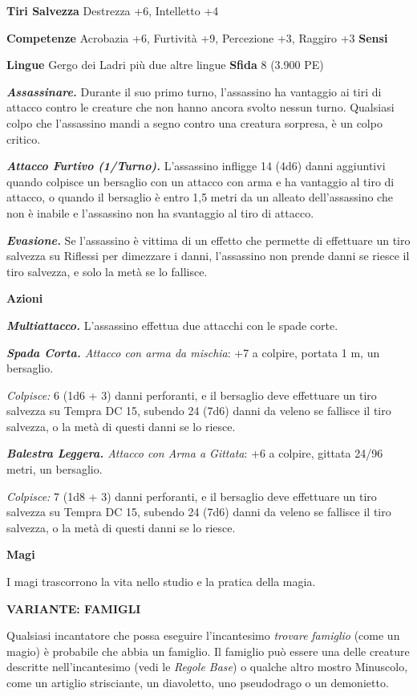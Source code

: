 \begin{multicols}{2}
\textbf{Tiri Salvezza} Destrezza +6, Intelletto +4

\textbf{Competenze} Acrobazia +6, Furtività +9, Percezione +3, Raggiro +3
\textbf{Sensi} 

\textbf{Lingue} Gergo dei Ladri più due altre lingue \textbf{Sfida} 8
(3.900 PE)\smallskip

\emph{\textbf{Assassinare.}} Durante il suo primo turno, l'assassino ha
vantaggio ai tiri di attacco contro le creature che non hanno ancora
svolto nessun turno. Qualsiasi colpo che l'assassino mandi a segno
contro una creatura sorpresa, è un colpo critico.

\emph{\textbf{Attacco Furtivo (1/Turno).}} L'assassino infligge 14 (4d6)
danni aggiuntivi quando colpisce un bersaglio con un attacco con arma e
ha vantaggio al tiro di attacco, o quando il bersaglio è entro 1,5 metri
da un alleato dell'assassino che non è inabile e l'assassino non ha
svantaggio al tiro di attacco.

\emph{\textbf{Evasione.}} Se l'assassino è vittima di un effetto che
permette di effettuare un tiro salvezza su Riflessi per dimezzare i
danni, l'assassino non prende danni se riesce il tiro salvezza, e solo
la metà se lo fallisce.

\smallskip\textbf{Azioni}

\emph{\textbf{Multiattacco.}} L'assassino effettua due attacchi con le
spade corte.

\emph{\textbf{Spada Corta.} Attacco con arma da mischia}: +7 a colpire,
portata 1 m, un bersaglio.

\emph{Colpisce:} 6 (1d6 + 3) danni perforanti, e il bersaglio deve
effettuare un tiro salvezza su Tempra DC 15, subendo 24 (7d6)
danni da veleno se fallisce il tiro salvezza, o la metà di questi danni
se lo riesce.

\emph{\textbf{Balestra Leggera.} Attacco con Arma a Gittata}: +6 a
colpire, gittata 24/96 metri, un bersaglio.

\emph{Colpisce:} 7 (1d8 + 3) danni perforanti, e il bersaglio deve
effettuare un tiro salvezza su Tempra DC 15, subendo 24 (7d6)
danni da veleno se fallisce il tiro salvezza, o la metà di questi danni
se lo riesce.

\textbf{Magi}

I magi trascorrono la vita nello studio e la pratica della magia.

\textbf{VARIANTE: FAMIGLI}

Qualsiasi incantatore che possa eseguire l'incantesimo \emph{trovare}
\emph{famiglio} (come un magio) è probabile che abbia un famiglio. Il
famiglio può essere una delle creature descritte nell'incantesimo (vedi
le \emph{Regole Base}) o qualche altro mostro Minuscolo, come un
artiglio strisciante, un diavoletto, uno pseudodrago o un demonietto.


\end{multicols}
